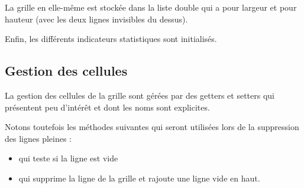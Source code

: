 La grille en elle-même est stockée dans la liste double  qui a pour largeur  et pour hauteur  (avec les deux lignes invisibles du dessus).

Enfin, les différents indicateurs statistiques sont initialisés.


\subsection{Gestion des cellules}
La gestion des cellules de la grille sont gérées par des getters et setters qui présentent peu d'intérêt et dont les noms sont explicites.

Notons toutefois les méthodes suivantes qui seront utilisées lors de la suppression des lignes pleines :
\begin{itemize}
	\item {} qui teste si la ligne  est vide
	\item {} qui supprime la ligne  de la grille et rajoute une ligne vide en haut.
\end{itemize}

